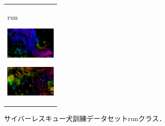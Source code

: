 \begin{figure}[H]
\begin{tabular}{l}
\begin{minipage}{0.165\hsize}
\begin{center}
          \hspace{2.0cm} {run}
        \end{center}
      \end{minipage}
      \begin{minipage}{0.165\hsize}
        \begin{center}
          \includegraphics[clip, width=2.5cm]{./Figures/optic_run4.eps}
          \hspace{0.1cm} { }
        \end{center}
      \end{minipage}
      \begin{minipage}{0.165\hsize}
        \begin{center}
          \includegraphics[clip, width=2.5cm]{./Figures/optic_run5.eps}
          \hspace{2.2cm} { }
        \end{center}
      \end{minipage}
    \end{tabular}
    \caption{サイバーレスキュー犬訓練データセットrunクラス．}
    \label{run}
\end{figure}

